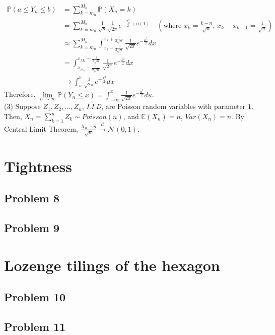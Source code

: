 \documentclass[12pt]{article}
\begin{document}
\begin{align*}
	\mathbb{P}(a\leqslant Y_{n}\leqslant b)&=\sum_{k=m_{n}}^{M_{n}}\mathbb{P}(X_{n}=k)\\
	&=\sum_{k=m_{n}}^{M_{n}}\frac{1}{\sqrt{n}}\frac{1}{\sqrt{2\pi}}e^{-\frac{x_{k}^2}{2}+o(1)}\quad(\text{where $x_{k}=\frac{k-n}{\sqrt{n}}$, $x_{k}-x_{k-1}=\frac{1}{\sqrt{n}}$})\\
	&\approx \sum_{k=m_{n}}^{M_{n}}\int_{x_{k}-\frac{1}{2\sqrt{n}}}^{x_{k}+\frac{1}{2\sqrt{n}}} \frac{1}{\sqrt{2\pi}}e^{-\frac{x^2}{2}}dx\\
	&=\int_{x_{m_{n}}-\frac{1}{2\sqrt{n}}}^{x_{M_{n}}+\frac{1}{2\sqrt{n}}} \frac{1}{\sqrt{2\pi}}e^{-\frac{x^2}{2}}dx\\
	& \rightarrow \int_{a}^{b}\frac{1}{\sqrt{2\pi}}e^{-\frac{x^2}{2}}dx
\end{align*}
Therefore, $\lim\limits_{n\rightarrow\infty}\mathbb{P}(Y_{n}\leqslant x)=\int_{-\infty}^{x}\frac{1}{\sqrt{2\pi}}e^{-\frac{u^2}{2}}du$.\\
(3) Suppose $Z_{1},Z_{2},\dots, Z_{n}$, \emph{I.I.D}, are Poisson random variables with parameter $1$. Then, $X_{n}=\sum\limits_{k=1}^{n}Z_{k}\sim Poisson(n)$, and $\mathbb{E}(X_{n})=n$, $Var(X_{n})=n$. By Central Limit Theorem, $\frac{X_{n}-n}{\sqrt{n}}\xrightarrow{d}\mathcal{N}(0,1)$.

\section{Tightness}

	\subsection*{Problem 8}
	
		
		
	
	\subsection*{Problem 9}


\section{Lozenge tilings of the hexagon}

	\subsection*{Problem 10}
	
	\subsection*{Problem 11}
\end{document}
